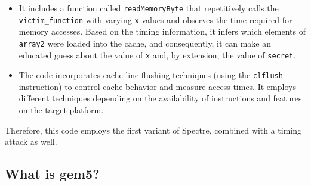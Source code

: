 \documentclass[twocolumn,showpacs,%
  nofootinbib,aps,superscriptaddress,%
  eqsecnum,prd,notitlepage,showkeys,10pt]{revtex4-1}
\begin{document}
\begin{itemize}
  \item It includes a function called \texttt{readMemoryByte} that repetitively calls the \texttt{victim\_function} with varying \texttt{x} values and observes the time required for memory accesses. Based on the timing information, it infers which elements of \texttt{array2} were loaded into the cache, and consequently, it can make an educated guess about the value of \texttt{x} and, by extension, the value of \texttt{secret}.
  
  \item The code incorporates cache line flushing techniques (using the \texttt{clflush} instruction) to control cache behavior and measure access times. It employs different techniques depending on the availability of instructions and features on the target platform.
\end{itemize}

Therefore, this code employs the first variant of Spectre, combined with a timing attack as well.






\subsection{What is gem5?}
\end{document}
